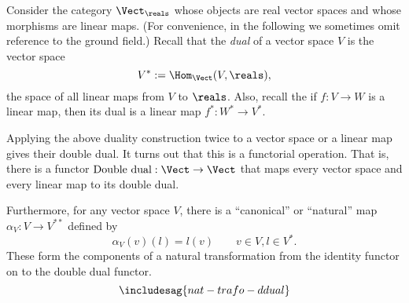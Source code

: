\begin{example}
  Consider the category $\Vect_{\reals}$ whose objects are real vector spaces and whose morphisms are linear maps. (For convenience, in the following we sometimes omit reference to the ground field.) Recall that the \emph{dual} of a vector space $V$ is the vector space
  \[
  V^* := \Hom_{\Vect}(V, \reals),
  \]
   the space of all linear maps from $V$ to $\reals$. Also, recall the if $f: V \rightarrow W$ is a linear map, then its dual is a linear map $f^*: W^* \rightarrow V^*$.

  Applying the above duality construction twice to a vector space or a linear map gives their double dual. It turns out that this is a functorial operation. That is, there is a functor $\text{Double dual}: \Vect \rightarrow \Vect$ that maps every vector space and every linear map to its double dual.

  Furthermore, for any vector space $V$, there is a ``canonical'' or ``natural'' map $\alpha_V : V \rightarrow V^{**}$ defined by
  \[
  \alpha_V(v)(l) = l(v) \quad \quad  v \in V, l \in V^*.
  \]
  These form the components of a natural transformation from the identity functor on \Vect to the double dual functor.
  \begin{equation}
    \includesag{nat-trafo-ddual}
  \end{equation}
\end{example}



